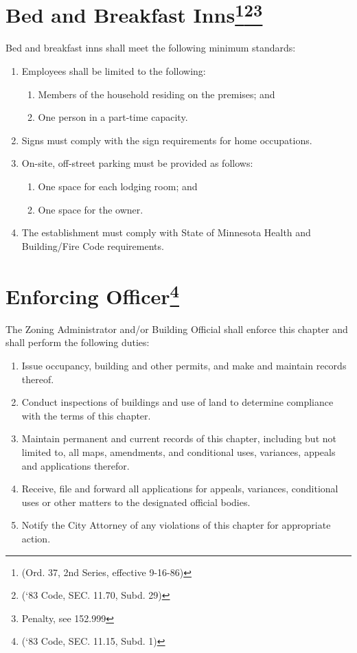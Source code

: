 \section{Bed and Breakfast Inns\footnote{(Ord. 37, 2nd Series, effective 9-16-86)}\footnote{(‘83 Code, SEC. 11.70, Subd. 29)}\footnote{Penalty, see 152.999}}
Bed and breakfast inns shall meet the following minimum standards:
\begin{enumerate}[{\indent}A)]
    \item Employees shall be limited to the following:
        \begin{enumerate}
            \item Members of the household residing on the premises; and 
            \item One person in a part-time capacity.
        \end{enumerate}
    \item Signs must comply with the sign requirements for home occupations.
    \item On-site, off-street parking must be provided as follows: 
        \begin{enumerate}
            \item One space for each lodging room; and 
            \item One space for the owner.
        \end{enumerate}
    \item The establishment must comply with State of Minnesota Health and Building/Fire Code requirements.
\end{enumerate}


\setcounter{section}{194}
\section{Enforcing Officer\footnote{(‘83 Code, SEC. 11.15, Subd. 1)}}
The Zoning Administrator and/or Building Official shall enforce this chapter and shall perform the following duties:
\begin{enumerate}[{\indent}A)]
    \item Issue occupancy, building and other permits, and make and maintain records thereof.
    \item Conduct inspections of buildings and use of land to determine compliance with the terms of this chapter.
    \item Maintain permanent and current records of this chapter, including but not limited to, all maps, amendments, and conditional uses, variances, appeals and applications therefor.
    \item Receive, file and forward all applications for appeals, variances, conditional uses or other matters to the designated official bodies.
    \item Notify the City Attorney of any violations of this chapter for appropriate action.
\end{enumerate}
